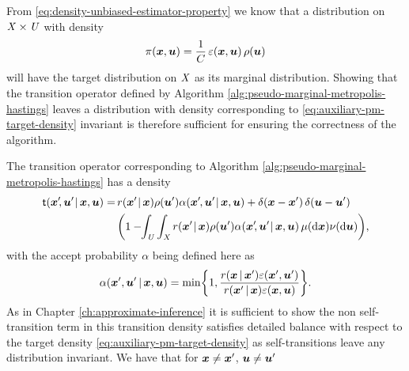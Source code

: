 From \eqref{eq:density-unbiased-estimator-property} we know that a distribution on $\mathit{X}\times\mathit{U}$ with density
\begin{equation}\label{eq:auxiliary-pm-target-density}
  \pi(\boldsymbol{x},\boldsymbol{u}) = \frac{1}{C} \,\varepsilon(\boldsymbol{x},\boldsymbol{u})\,\rho(\boldsymbol{u})
\end{equation}
will have the target distribution on $\mathit{X}$ as its marginal distribution. Showing that the transition operator defined by Algorithm \ref{alg:pseudo-marginal-metropolis-hastings} leaves a distribution with density corresponding to \eqref{eq:auxiliary-pm-target-density} invariant is therefore sufficient for ensuring the correctness of the algorithm.

The transition operator corresponding to Algorithm \ref{alg:pseudo-marginal-metropolis-hastings} has a density%
\begin{equation*}
\begin{split}
  \trans(\vct{x}'\kern-2pt,\vct{u}'\kern-1pt\gvn\vct{x},\vct{u}) =\,&
  r(\vct{x}'\kern-1pt\gvn\vct{x}) \rho(\vct{u}') \alpha(\vct{x}'\kern-1pt,\vct{u}'\kern-1pt\gvn\vct{x},\vct{u}) +
  \delta(\vct{x} - \vct{x}')\,\delta(\vct{u} -\vct{u}')\\
  &
  \lpa 
    1 - \kern-3pt
    \int_{\set{U}} \int_{\set{X}} 
      r(\vct{x}'\kern-1pt\gvn\vct{x}) \rho(\vct{u}') \alpha(\vct{x}'\kern-2pt,\vct{u}'\kern-1pt\gvn\vct{x},\vct{u})
    \,\mu(\dr\vct{x})\nu(\dr\vct{u})
  \rpa,
\end{split}
\end{equation*}
with the accept probability $\alpha$ being defined here as
\begin{equation}
  \alpha(\vct{x}',\vct{u}'\gvn\vct{x},\vct{u}) =
  \min\lbr 1, \frac{r(\vct{x}\gvn\vct{x}')\esttgtdens(\vct{x}',\vct{u}')}{r(\vct{x}'\gvn\vct{x})\esttgtdens(\vct{x},\vct{u})}\rbr.
\end{equation}
As in Chapter \ref{ch:approximate-inference} it is sufficient to show the non self-transition term in this transition density satisfies detailed balance with respect to the target density \eqref{eq:auxiliary-pm-target-density} as self-transitions leave any distribution invariant. We have that for $\boldsymbol{x} \neq \boldsymbol{x}'$, $\boldsymbol{u} \neq \boldsymbol{u}'$
